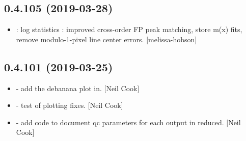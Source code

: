 \documentclass[a4paper,10pt,english]{report}
\begin{document}
\subsection{0.4.105 (2019-03-28)}
\label{\detokenize{misc/changelog:id157}}\begin{itemize}
\item {} 
: log statistics : improved cross-order FP
peak matching, store m(x) fits, remove modulo-1-pixel line center
errors. {[}melissa-hobson{]}

\end{itemize}


\subsection{0.4.101 (2019-03-25)}
\label{\detokenize{misc/changelog:id158}}\begin{itemize}
\item {} 
 - add the debanana plot in. {[}Neil Cook{]}

\item {} 
 - test of plotting fixes. {[}Neil Cook{]}

\item {} 
 - add code to document qc parameters for each output in
reduced. {[}Neil Cook{]}

\end{itemize}
\end{document}
